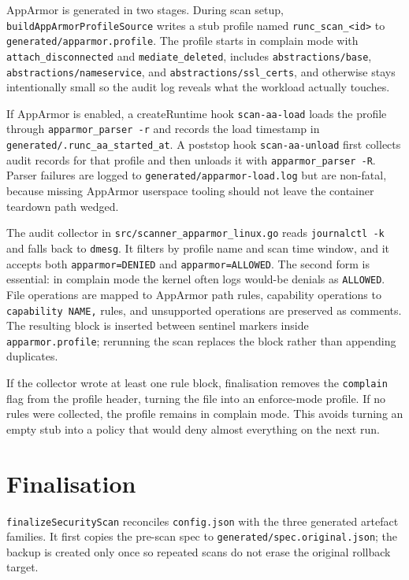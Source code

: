AppArmor is generated in two stages. During scan setup, \texttt{buildAppArmorProfileSource} writes a stub profile named \texttt{runc\_scan\_<id>} to \texttt{generated/apparmor.profile}. The profile starts in complain mode with \texttt{attach\_disconnected} and \texttt{mediate\_deleted}, includes \texttt{abstractions/base}, \texttt{abstractions/nameservice}, and \texttt{abstractions/ssl\_certs}, and otherwise stays intentionally small so the audit log reveals what the workload actually touches.

If AppArmor is enabled, a createRuntime hook \texttt{scan-aa-load} loads the profile through \texttt{apparmor\_parser -r} and records the load timestamp in \texttt{generated/.runc\_aa\_started\_at}. A poststop hook \texttt{scan-aa-unload} first collects audit records for that profile and then unloads it with \texttt{apparmor\_parser -R}. Parser failures are logged to \texttt{generated/apparmor-load.log} but are non-fatal, because missing AppArmor userspace tooling should not leave the container teardown path wedged.

The audit collector in \texttt{src/scanner\_apparmor\_linux.go} reads \texttt{journalctl -k} and falls back to \texttt{dmesg}. It filters by profile name and scan time window, and it accepts both \texttt{apparmor=DENIED} and \texttt{apparmor=ALLOWED}. The second form is essential: in complain mode the kernel often logs would-be denials as \texttt{ALLOWED}. File operations are mapped to AppArmor path rules, capability operations to \texttt{capability NAME,} rules, and unsupported operations are preserved as comments. The resulting block is inserted between sentinel markers inside \texttt{apparmor.profile}; rerunning the scan replaces the block rather than appending duplicates.

If the collector wrote at least one rule block, finalisation removes the \texttt{complain} flag from the profile header, turning the file into an enforce-mode profile. If no rules were collected, the profile remains in complain mode. This avoids turning an empty stub into a policy that would deny almost everything on the next run.

\section{Finalisation}\label{sec:impl-final}

\texttt{finalizeSecurityScan} reconciles \texttt{config.json} with the three generated artefact families. It first copies the pre-scan spec to \texttt{generated/spec.original.json}; the backup is created only once so repeated scans do not erase the original rollback target.

